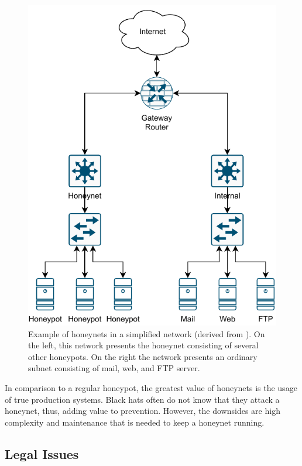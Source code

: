 \begin{figure}[ht]
    \centering
    \includegraphics{figures/honeynet-example.pdf}
    \caption[Example of honeynets in a simplified network]{Example of honeynets in a simplified network (derived from \cite{Spitzner2003}). On the left, this network presents the honeynet consisting of several other honeypots. On the right the network presents an ordinary subnet consisting of mail, web, and FTP server.}
    \label{fig:honeynet-example}
\end{figure}

In comparison to a regular honeypot, the greatest value of honeynets is the usage of true production systems.
Black hats often do not know that they attack a honeynet, thus, adding value to prevention.
However, the downsides are high complexity and maintenance that is needed to keep a honeynet running. \cite{Spitzner2003}

\subsection{Legal Issues}

